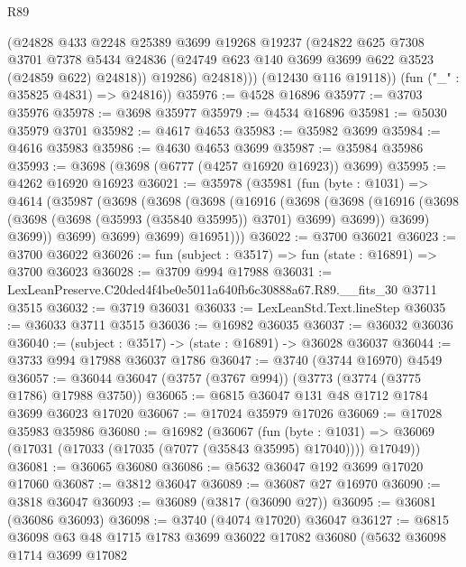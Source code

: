\begin{lexlean}{R89}
\begin{coremodule}
              (@24828
                @433
                @2248
                @25389
                @3699
                @19268
                @19237
                (@24822
                  @625
                  @7308
                  @3701
                  @7378
                  @5434
                  @24836
                  (@24749 @623 @140 @3699 @3699 @622 @3523 (@24859 @622) @24818))
                @19286)
              @24818)))
        (@12430 @116 @19118))
      (fun ("_" : @35825 @4831) => @24816))
@35976 := @4528 @16896
@35977 := @3703 @35976
@35978 := @3698 @35977
@35979 := @4534 @16896
@35981 := @5030 @35979 @3701
@35982 := @4617 @4653
@35983 := @35982 @3699
@35984 := @4616 @35983
@35986 := @4630 @4653 @3699
@35987 := @35984 @35986
@35993 := @3698 (@3698 (@6777 (@4257 @16920 @16923)) @3699)
@35995 := @4262 @16920 @16923
@36021 := @35978
    (@35981
      (fun (byte : @1031) =>
      @4614
        (@35987
          (@3698
            (@3698
              (@3698
                (@16916
                  (@3698
                    (@3698
                      (@16916 (@3698 (@3698 (@3698 (@35993 (@35840 @35995)) @3701) @3699) @3699))
                      @3699)
                    @3699))
                @3699)
              @3699)
            @3699)
          @16951)))
@36022 := @3700 @36021
@36023 := @3700 @36022
@36026 := fun (subject : @3517) => fun (state : @16891) => @3700 @36023
@36028 := @3709 @994 @17988
@36031 := LexLeanPreserve.C20ded4f4be0e5011a640fb6c30888a67.R89.__fits_30 @3711 @3515
@36032 := @3719 @36031
@36033 := LexLeanStd.Text.lineStep
@36035 := @36033 @3711 @3515
@36036 := @16982 @36035
@36037 := @36032 @36036
@36040 := (subject : @3517) -> (state : @16891) -> @36028 @36037
@36044 := @3733 @994 @17988 @36037 @1786
@36047 := @3740 (@3744 @16970) @4549
@36057 := @36044 @36047 (@3757 (@3767 @994)) (@3773 (@3774 (@3775 @1786) @17988 @3750))
@36065 := @6815 @36047 @131 @48 @1712 @1784 @3699 @36023 @17020
@36067 := @17024 @35979 @17026
@36069 := @17028 @35983 @35986
@36080 := @16982
    (@36067
      (fun (byte : @1031) =>
      @36069 (@17031 (@17033 (@17035 (@7077 (@35843 @35995) @17040)))) @17049))
@36081 := @36065 @36080
@36086 := @5632 @36047 @192 @3699 @17020 @17060
@36087 := @3812 @36047
@36089 := @36087 @27 @16970
@36090 := @3818 @36047
@36093 := @36089 (@3817 (@36090 @27))
@36095 := @36081 (@36086 @36093)
@36098 := @3740 (@4074 @17020) @36047
@36127 := @6815
    @36098
    @63
    @48
    @1715
    @1783
    @3699
    @36022
    @17082
    @36080
    (@5632
      @36098
      @1714
      @3699
      @17082

\end{coremodule}
\end{lexlean}
